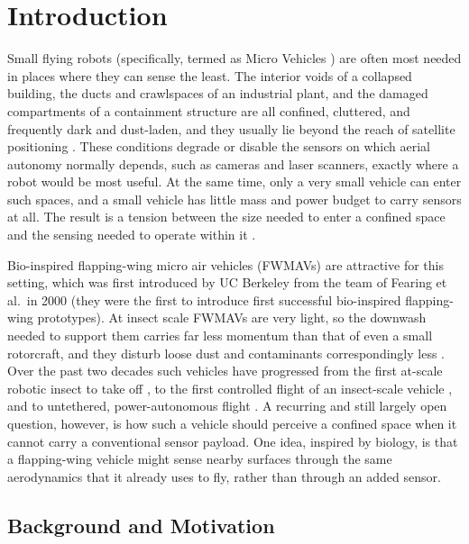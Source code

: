 \documentclass[final,5p,times]{elsarticle}
\begin{document}
\section{Introduction}
\label{sec:introduction}

Small flying robots (specifically, termed as Micro Vehicles \cite{xiao2021review}) are often most needed in places where they can sense the least. The interior voids of a collapsed building, the ducts and crawlspaces of an industrial plant, and the damaged compartments of a containment structure are all confined, cluttered, and frequently dark and dust-laden, and they usually lie beyond the reach of satellite positioning \cite{ebadi2024slam, tranzatto2022cerberus}. These conditions degrade or disable the sensors on which aerial autonomy normally depends, such as cameras and laser scanners, exactly where a robot would be most useful. At the same time, only a very small vehicle can enter such spaces, and a small vehicle has little mass and power budget to carry sensors at all. The result is a tension between the size needed to enter a confined space and the sensing needed to operate within it \cite{floreano2015science}.

Bio-inspired flapping-wing micro air vehicles (FWMAVs) are attractive for this setting, which was first introduced by UC Berkeley from the team of Fearing et al.\ in 2000 (they were the first to introduce first successful bio-inspired flapping-wing prototypes)\cite{fearing2000wing}. At insect scale FWMAVs are very light, so the downwash needed to support them carries far less momentum than that of even a small rotorcraft, and they disturb loose dust and contaminants correspondingly less \cite{floreano2015science}. Over the past two decades such vehicles have progressed from the first at-scale robotic insect to take off \cite{wood2008first}, to the first controlled flight of an insect-scale vehicle \cite{ma2013controlled}, and to untethered, power-autonomous flight \cite{jafferis2019untethered}. A recurring and still largely open question, however, is how such a vehicle should perceive a confined space when it cannot carry a conventional sensor payload. One idea, inspired by biology, is that a flapping-wing vehicle might sense nearby surfaces through the same aerodynamics that it already uses to fly, rather than through an added sensor.

\subsection{Background and Motivation}
\label{sec:background}
\end{document}
